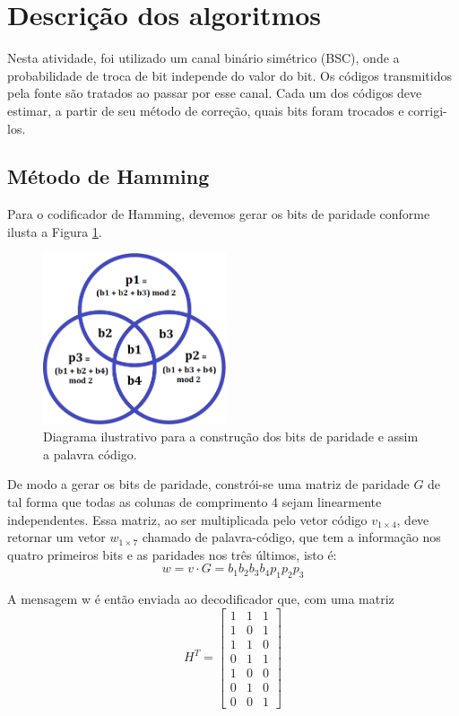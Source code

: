 \documentclass[%
aip,
jmp,%
amsmath,amssymb,
reprint,%
]{revtex4-1}
\begin{document}
	
	
	\section{Descrição dos algoritmos}
	
	Nesta atividade, foi utilizado um canal binário simétrico (BSC), onde a probabilidade de troca de bit independe do valor do bit. Os códigos transmitidos pela fonte são tratados ao passar por esse canal. Cada um dos códigos deve estimar, a partir de seu método de correção, quais bits foram trocados e corrigi-los.
	
	\subsection{Método de Hamming}
	Para o codificador de Hamming, devemos gerar os bits de paridade conforme ilusta a Figura \ref{fig:hammingdiagrama}.
	
	\begin{figure}[h]
		\centering
		\includegraphics[width=0.48\textwidth]{images/hamming}
		\caption{Diagrama ilustrativo para a construção dos bits de paridade e assim a palavra código.}
		\label{fig:hammingdiagrama}
	\end{figure}
	
	De modo a gerar os bits de paridade, constrói-se uma matriz de paridade $G$ de tal forma que todas as colunas de comprimento 4 sejam linearmente independentes. Essa matriz, ao ser multiplicada pelo vetor código $v_{1\times4}$, deve retornar um vetor $w_{1\times7}$ chamado de palavra-código, que tem a informação nos quatro primeiros bits e as paridades nos três últimos, isto é:	
	\begin{equation}
		w = v\cdot G = b_{1}b_{2}b_{3}b_{4}p_{1}p_{2}p_{3}
	\end{equation}
	
	A mensagem w é então enviada ao decodificador que, com uma matriz	
	\begin{equation}
	H^{T} = \left[\begin{array}{ccc}
	1 & 1 & 1 \\
	1 & 0 & 1 \\
	1 & 1 & 0 \\
	0 & 1 & 1 \\
	1 & 0 & 0 \\
	0 & 1 & 0 \\
	0 & 0 & 1
	\end{array}
	\right]
	\end{equation}
	
\end{document}
